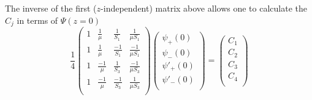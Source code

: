 \documentclass[%
 reprint,
 amsmath,
 amssymb,
 aps,
 prl,
 lengthcheck,%
]{revtex4-1}
\begin{document}

The inverse of the first ($z$-independent) matrix above allows one to
calculate the $C_j$ in terms of $\Psi(z=0)$
\begin{equation}
\label{eq:p_to_cd}
\frac{1}{4}
  \begin{pmatrix}
    1 & \frac{1}{\mu} & \frac{1}{S_1} & \frac{1}{\mu S_1} \\[0.3em]
    1 & \frac{1}{\mu} & \frac{-1}{S_1} & \frac{-1}{\mu S_1} \\[0.3em]
    1 & \frac{-1}{\mu} & \frac{1}{S_3} & \frac{-1}{\mu S_3} \\[0.3em]
    1 & \frac{-1}{\mu} & \frac{-1}{S_3} & \frac{1}{\mu S_3} \\[0.3em]
  \end{pmatrix}
  \begin{pmatrix}
    \psi_{+}(0) \\[0.3em]
    \psi_{-}(0) \\[0.3em]
    \psi'_{+}(0) \\[0.3em]
    \psi'_{-}(0) \\[0.3em]
  \end{pmatrix}
  = 
  \begin{pmatrix}
    C_1  \\[0.3em]
    C_2  \\[0.3em]
    C_3  \\[0.3em]
    C_4  \\[0.3em]
  \end{pmatrix}
\end{equation}
\end{document}
